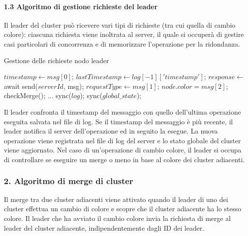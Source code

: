 \documentclass[12pt, a4paper]{report}
\begin{document}
\newpage
\paragraph{1.3 Algoritmo di gestione richieste del leader}

Il leader del cluster pu\`o ricevere vari tipi di richieste (tra cui quella di cambio colore): ciascuna richiesta viene inoltrata al server, il quale si occuper\`a di gestire casi particolari di concorrenza e di memorizzare l'operazione per la ridondanza.

\begin{algorithm}[H]
\caption{Gestione delle richieste nodo leader}
\begin{algorithmic}[1]
    \State $timestamp \gets msg[0]$;
    \State $lastTimestamp \gets log[-1]['timestamp']$;
        \State $response \gets$ await send($serverId$, msg);
            \State $requestType \gets msg[1]$;
                \State $node.color = msg[2]$;
                \State checkMerge();
            \Else
                \State $\ldots$ 
            \EndIf
        \EndIf
        \State sync($log$);
        \State sync($global\_state$);
    \EndIf
\EndProcedure
\end{algorithmic}
\end{algorithm}

Il leader confronta il timestamp del messaggio con quello dell'ultima operazione eseguita salvata nel file di log. Se il timestamp del messaggio \`e pi\`u recente, il leader notifica il server dell'operazione ed in seguito la esegue. La nuova operazione viene registrata nel file di log del server e lo stato globale del cluster viene aggiornato. Nel caso di un'operazione di cambio colore, il leader si occupa di controllare se eseguire un merge o meno in base al colore dei cluster adiacenti.

\subsubsection{2. Algoritmo di merge di cluster}
\label{sec:merge}
Il merge tra due cluster adiacenti viene attivato quando il leader di uno dei cluster effettua un cambio di colore e scopre che il cluster adiacente ha lo stesso colore. Il leader che ha avviato il cambio colore invia la richiesta di merge al leader del cluster adiacente, indipendentemente dagli ID dei leader.
\end{document}
